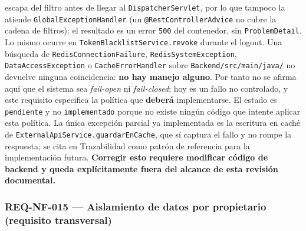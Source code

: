 \documentclass[
  spanish,
]{article}
\begin{document}
\begin{itemize}
  escapa del filtro antes de llegar al \texttt{Dispatcher\allowbreak{}Servlet}, por
  lo que tampoco la atiende \texttt{Global\allowbreak{}Exception\allowbreak{}Handler} (un
  \texttt{@Rest\allowbreak{}Controller\allowbreak{}Advice} no cubre la cadena de filtros): el
  resultado es un error \texttt{500} del contenedor, sin
  \texttt{Problem\allowbreak{}Detail}. Lo mismo ocurre en
  \texttt{Token\allowbreak{}Blacklist\allowbreak{}Service.\allowbreak{}revoke} durante el logout. Una búsqueda
  de \texttt{Redis\allowbreak{}Connection\allowbreak{}Failure}, \texttt{Redis\allowbreak{}System\allowbreak{}Exception},
  \texttt{Data\allowbreak{}Access\allowbreak{}Exception} o \texttt{Cache\allowbreak{}Error\allowbreak{}Handler} sobre
  \texttt{Backend/\allowbreak{}src/\allowbreak{}main/\allowbreak{}java/} no devuelve ninguna coincidencia:
  \textbf{no hay manejo alguno}. Por tanto no se afirma aquí que el
  sistema sea \emph{fail-open} ni \emph{fail-closed}: hoy es un fallo no
  controlado, y este requisito especifica la política que
  \textbf{deberá} implementarse. El estado es \texttt{pendiente} y no
  \texttt{implementado} porque no existe ningún código que intente
  aplicar esta política. La única excepción parcial ya implementada es
  la escritura en caché de \texttt{External\allowbreak{}Api\allowbreak{}Service.\allowbreak{}guardar\allowbreak{}En\allowbreak{}Cache},
  que sí captura el fallo y no rompe la respuesta; se cita en
  Trazabilidad como patrón de referencia para la implementación futura.
  \textbf{Corregir esto requiere modificar código de backend y queda
  explícitamente fuera del alcance de esta revisión documental.}
\end{itemize}

\subsubsection{REQ-NF-015 --- Aislamiento de datos por propietario
(requisito
transversal)}\label{req-nf-015-aislamiento-de-datos-por-propietario-requisito-transversal}
\end{document}
